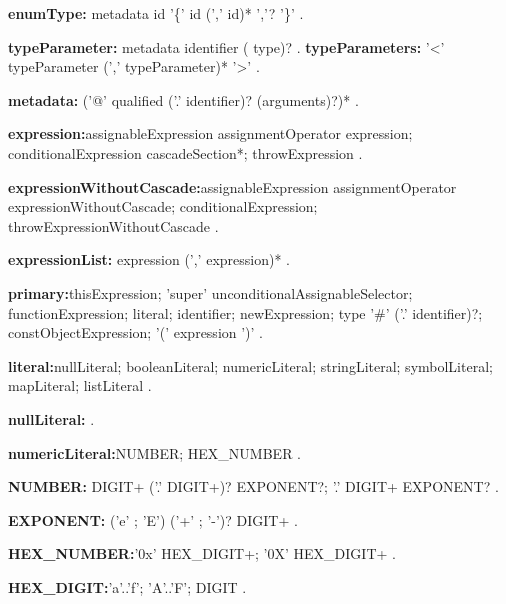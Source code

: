 \begin{grammar}
{\bf enumType:}
metadata \ENUM{} id '\{' id (',' id)* ','? '\}'
    .
\end{grammar}
\begin{grammar}
{\bf typeParameter:}
     metadata identifier (\EXTENDS{} type)?
    .
{\bf typeParameters:}
     '<' typeParameter (',' typeParameter)* '>'
    .
\end{grammar}
\begin{grammar}
{\bf metadata:}
      ('@' qualified ('.' identifier)? (arguments)?)*
    .
\end{grammar}
\begin{grammar}

{\bf expression:}assignableExpression assignmentOperator expression;
       conditionalExpression cascadeSection*;
       throwExpression     
    .
     
    
{\bf expressionWithoutCascade:}assignableExpression assignmentOperator expressionWithoutCascade;
      conditionalExpression;
      throwExpressionWithoutCascade    
    .

{\bf expressionList:}
      expression (',' expression)* %
    .
\end{grammar}
\begin{grammar}
{\bf primary:}thisExpression;
      'super' unconditionalAssignableSelector;
      functionExpression;
      literal;
      identifier;
      newExpression;
      \NEW{} type '\#' ('.' identifier)?;
      constObjectExpression;
      '(' expression ')'
    .
    
\end{grammar}
\begin{grammar}
{\bf literal:}nullLiteral;
      booleanLiteral;
      numericLiteral;
      stringLiteral;
      symbolLiteral;
      mapLiteral;
      listLiteral
    .
 \end{grammar}
\begin{grammar}
{\bf nullLiteral:}
      \NULL{}
.
\end{grammar}
\begin{grammar}
{\bf numericLiteral:}NUMBER;
      HEX_NUMBER
    .
    
  {\bf NUMBER:} DIGIT+ ('.' DIGIT+)? EXPONENT?;
      '.' DIGIT+ EXPONENT?
    .

{\bf  EXPONENT:}
      ('e' ; 'E') ('+' ; '-')? DIGIT+
    .

{\bf HEX_NUMBER:}'0x' HEX_DIGIT+;
      '0X' HEX_DIGIT+
    .

 {\bf HEX_DIGIT:}'a'..'f';
      'A'..'F';
      DIGIT
    .
 \end{grammar}
